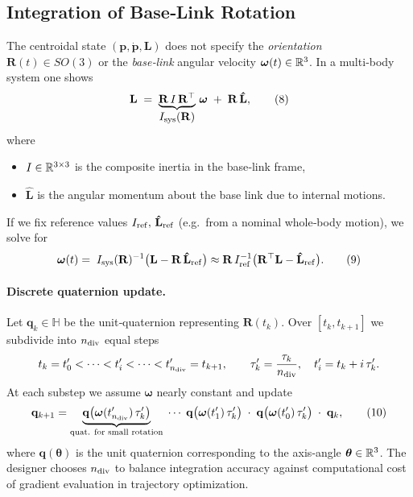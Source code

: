\documentclass[main.tex]{subfiles}
\begin{document}
\bigskip
\subsection{Integration of Base‐Link Rotation}

The centroidal state $(\mathbf{p},\dot{\mathbf{p}},\mathbf{L})$ does not specify the \emph{orientation} $\mathbf{R}(t)\in SO(3)$ or the \emph{base‐link} angular velocity $\boldsymbol{\omega}(t)\in\Bbb R^3$.  In a multi‐body system one shows
\[
\mathbf{L} \;=\; \underbrace{\mathbf{R}\,I\,\mathbf{R}^\top}_{\displaystyle I_{\rm sys}(\mathbf{R})}\,\boldsymbol{\omega}
\;+\;\mathbf{R}\,\mathbf{\hat{L}},
\tag{8}
\]
where
\begin{itemize}
  \item $I\in\Bbb R^{3\times3}$ is the composite inertia in the base‐link frame,
  \item $\mathbf{\hat{L}}$ is the angular momentum about the base link due to internal motions.
\end{itemize}
If we fix reference values $I_{\rm ref},\,\mathbf{\hat{L}}_{\rm ref}$ (e.g.\ from a nominal whole‐body motion), we solve for
\[
\boldsymbol{\omega}(t)
= \;I_{\rm sys}(\mathbf{R})^{-1}\bigl(\mathbf{L} - \mathbf{R}\,\mathbf{\hat{L}}_{\rm ref}\bigr)
\approx \mathbf{R}\,I_{\rm ref}^{-1}\bigl(\mathbf{R}^\top \mathbf{L} - \mathbf{\hat{L}}_{\rm ref}\bigr).
\tag{9}
\]

\paragraph{Discrete quaternion update.}
Let $\mathbf{q}_k\in\mathbb{H}$ be the unit‐quaternion representing $\mathbf{R}(t_k)$.
Over $[t_k,t_{k+1}]$ we subdivide into $n_{\rm div}$ equal steps
\[
t_k = t'_0 < \cdots < t'_i < \cdots < t'_{n_{\rm div}} = t_{k+1},\qquad
\tau_k' = \frac{\tau_k}{n_{\rm div}},\quad
t'_i = t_k + i\,\tau_k'.
\]
At each substep we assume $\boldsymbol{\omega}$ nearly constant and update
\[
\mathbf{q}_{k+1}
= \underbrace{\mathbf{q}\bigl(\boldsymbol{\omega}(t'_{n_{\rm div}})\,\tau_k'\bigr)}
_{\text{quat. for small rotation}}
\;\cdots\;
\mathbf{q}\bigl(\boldsymbol{\omega}(t'_1)\,\tau_k'\bigr)\;\cdot\;
\mathbf{q}\bigl(\boldsymbol{\omega}(t'_0)\,\tau_k'\bigr)\;\cdot\;\mathbf{q}_k,
\tag{10}
\]
where $\mathbf{q}(\boldsymbol{\theta})$ is the unit quaternion corresponding to the axis‐angle $\boldsymbol{\theta}\in\Bbb R^3$.  The designer chooses $n_{\rm div}$ to balance integration accuracy against computational cost of gradient evaluation in trajectory optimization.
\end{document}
